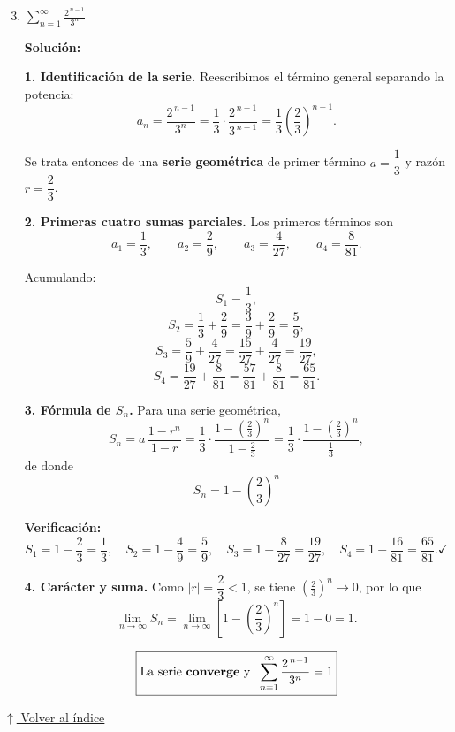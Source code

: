 \documentclass[12pt]{article}
\newcommand{\solucion}{%
    \vspace{0.8em}%
    \textbf{Solución:}%
}
\newcommand{\volverindice}{%
    \vspace{1em}%
    \begin{flushright}%
        \hyperlink{indice}{\small $\uparrow$ Volver al índice}%
    \end{flushright}%
}
\begin{document}
\begin{enumerate}[label=\alph*.-]

    \setcounter{enumi}{2} %

    \item $\displaystyle\sum_{n=1}^{\infty}\frac{2^{\,n-1}}{3^{n}}$

    \solucion

    \textbf{1. Identificación de la serie.} Reescribimos el término general
    separando la potencia:
    \[
    a_n=\frac{2^{\,n-1}}{3^{n}}
    =\frac{1}{3}\cdot\frac{2^{\,n-1}}{3^{\,n-1}}
    =\frac13\left(\frac23\right)^{n-1}.
    \]

    Se trata entonces de una \textbf{serie geométrica} de primer término
    $a=\dfrac13$ y razón $r=\dfrac23$.

    \textbf{2. Primeras cuatro sumas parciales.} Los primeros términos son
    \[
    a_1=\frac13,\qquad
    a_2=\frac{2}{9},\qquad
    a_3=\frac{4}{27},\qquad
    a_4=\frac{8}{81}.
    \]

    Acumulando:
    \[
    S_1=\frac13,
    \]
    \[
    S_2=\frac13+\frac29=\frac{3}{9}+\frac29=\frac59,
    \]
    \[
    S_3=\frac59+\frac{4}{27}=\frac{15}{27}+\frac{4}{27}=\frac{19}{27},
    \]
    \[
    S_4=\frac{19}{27}+\frac{8}{81}=\frac{57}{81}+\frac{8}{81}=\frac{65}{81}.
    \]

    \textbf{3. Fórmula de $S_n$.} Para una serie geométrica,
    \[
    S_n=a\,\frac{1-r^{n}}{1-r}
    =\frac13\cdot\frac{1-\left(\frac23\right)^{n}}{1-\frac23}
    =\frac13\cdot\frac{1-\left(\frac23\right)^{n}}{\frac13},
    \]
    de donde
    \[
    \boxed{
    S_n=1-\left(\frac23\right)^{n}
    }
    \]

    \textbf{Verificación:}
    \[
    S_1=1-\frac23=\frac13,\quad
    S_2=1-\frac49=\frac59,\quad
    S_3=1-\frac{8}{27}=\frac{19}{27},\quad
    S_4=1-\frac{16}{81}=\frac{65}{81}. \checkmark
    \]

    \textbf{4. Carácter y suma.} Como $|r|=\dfrac23<1$, se tiene
    $\left(\frac23\right)^{n}\to 0$, por lo que
    \[
    \lim_{n\to\infty}S_n=\lim_{n\to\infty}\left[1-\left(\frac23\right)^{n}\right]
    =1-0=1 .
    \]

    \[
    \boxed{
    \text{La serie \textbf{converge} y }\;
    \sum_{n=1}^{\infty}\frac{2^{\,n-1}}{3^{n}}=1
    }
    \]

\end{enumerate}

\volverindice
\newpage

\setcounter{section}{7}
\end{document}
